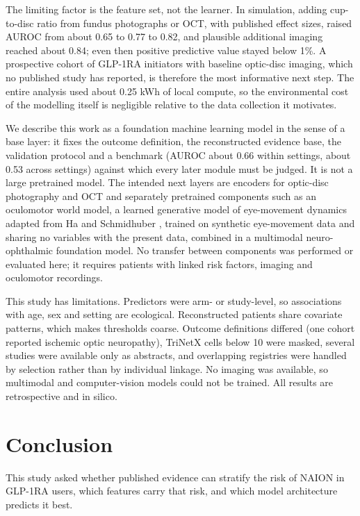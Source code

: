 \documentclass[journal]{IEEEtran}
\begin{document}
The limiting factor is the feature set, not the learner. In simulation,
adding cup-to-disc ratio from fundus photographs or OCT, with published
effect sizes, raised AUROC from about 0.65 to 0.77 to 0.82, and
plausible additional imaging reached about 0.84; even then positive
predictive value stayed below 1\%. A prospective cohort of GLP-1RA
initiators with baseline optic-disc imaging, which no published study
has reported, is therefore the most informative next step. The entire
analysis used about 0.25 kWh of local compute, so the environmental cost
of the modelling itself is negligible relative to the data collection it
motivates.

We describe this work as a foundation machine learning model in the
sense of a base layer: it fixes the outcome definition, the
reconstructed evidence base, the validation protocol and a benchmark
(AUROC about 0.66 within settings, about 0.53 across settings) against
which every later module must be judged. It is not a large pretrained
model. The intended next layers are encoders for optic-disc photography
and OCT and separately pretrained components such as an oculomotor world
model, a learned generative model of eye-movement dynamics adapted from
Ha and Schmidhuber \cite{ha2018}, trained on synthetic eye-movement
data and sharing no variables with the present data, combined in a
multimodal neuro-ophthalmic foundation model. No transfer between
components was performed or evaluated here; it requires patients with
linked risk factors, imaging and oculomotor recordings.

This study has limitations. Predictors were arm- or study-level, so
associations with age, sex and setting are ecological. Reconstructed
patients share covariate patterns, which makes thresholds coarse.
Outcome definitions differed (one cohort reported ischemic optic
neuropathy), TriNetX cells below 10 were masked, several studies were
available only as abstracts, and overlapping registries were handled by
selection rather than by individual linkage. No imaging was available,
so multimodal and computer-vision models could not be trained. All
results are retrospective and in silico.

\section{Conclusion}\label{conclusion}

This study asked whether published evidence can stratify the risk of
NAION in GLP-1RA users, which features carry that risk, and which model
architecture predicts it best.
\end{document}
